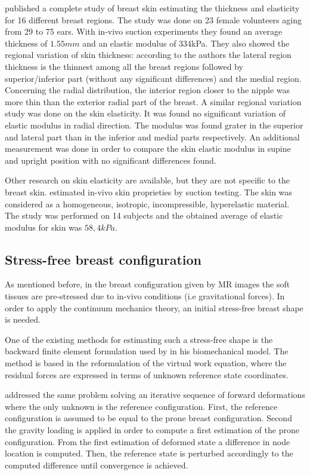 \cite{sutradhar_vivo_2013} published a complete study of breast skin estimating the thickness and elasticity for 16 different breast regions. The study was done on 23 female volunteers aging from 29 to 75 ears. With in-vivo suction experiments they found an average thickness of $1.55mm$ and an elastic modulus of 334kPa. They also showed the regional variation of skin thickness: according to the authors the lateral region thickness is the thinnest among all the breast regions followed by superior/inferior part (without any significant differences) and the medial region. Concerning the radial distribution, the interior region closer to the nipple was more thin than the exterior radial part of the breast. A similar regional variation study was done on the skin elasticity. It was found no significant variation of elastic modulus in radial direction. The modulus was found grater in the superior and lateral part than in the inferior and medial parts respectively. An additional measurement was done in order to compare the skin elastic modulus in supine and upright position with no significant differences found.

 Other research on skin elasticity are available, but they are not specific to the breast skin. \cite{hendriks_relative_2006} estimated in-vivo skin proprieties by suction testing. The skin was considered as a homogeneous, isotropic, incompressible, hyperelastic material. The study was performed on 14 subjects and the obtained average of elastic modulus for skin was $58,4 kPa$.  

\subsection{Stress-free breast configuration}
As mentioned before, in the breast configuration given by MR images the soft tissues are pre-stressed due to in-vivo conditions (i.e gravitational forces). In order to apply the continuum mechanics theory, an initial stress-free breast shape is needed. 

One of the existing methods for estimating such a stress-free shape is the backward finite element formulation used by \cite{pathmanathan_predicting_2006} in his biomechanical model. The method is based in the reformulation of the virtual work equation, where the residual forces are expressed in terms of unknown reference state coordinates. 

\cite{carter_biomechanical_2009} addressed the same problem solving an iterative sequence of forward deformations where the only unknown is the reference configuration. First, the reference configuration is assumed to be equal to the prone breast configuration. Second the gravity loading is applied in order to compute a first estimation of the prone configuration. From the first estimation of deformed state a difference in node location is computed. Then, the reference state is perturbed accordingly to the computed difference until convergence is achieved.

